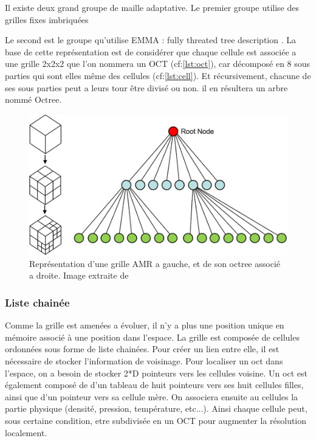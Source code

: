 Il existe deux grand groupe de maille adaptative.
Le premier groupe utilise des grilles fixes imbriquées %

Le second est le groupe qu'utilise EMMA : fully threated tree description \citep{khokhlov_fully_1998-1}.
La base de cette représentation est de considérer que chaque cellule est associée a une grille 2x2x2 que l'on nommera un OCT (cf:\ref{lst:oct}), car décomposé en 8 sous parties qui sont elles même des cellules (cf:\ref{lst:cell}).
Et récursivement, chacune de ses sous parties peut a leurs tour être divisé ou non.
il en résultera un arbre nommé Octree.

\begin{figure}[bth]
        \includegraphics[width=.95\linewidth]{img/02/octree.jpg} 
        \caption{Représentation d'une grille AMR a gauche, et de son octree associé a droite. 
        Image extraite de \cite{SU201659}
}
 		\label{fig:octree}
\end{figure}

\subsubsection{Liste chainée}

Comme la grille est amenées a évoluer, il n'y a plus une position unique en mémoire associé à une position dans l'espace.
La grille est composée de cellules ordonnées sous forme de liste chainées.
Pour créer un lien entre elle, il est nécessaire de stocker l'information de voisinage.
Pour localiser un oct dans l'espace, on a besoin de stocker 2*D pointeurs vers les cellules voisine.
Un oct est également composé de d'un tableau de huit pointeurs vers ses huit cellules filles,  ainsi que d'un pointeur vers sa cellule mère.
On associera ensuite au cellules la partie physique (densité, pression, température, etc...).
Ainsi chaque cellule peut, sous certaine condition, etre subdivisée en un OCT pour augmenter la résolution localement.


